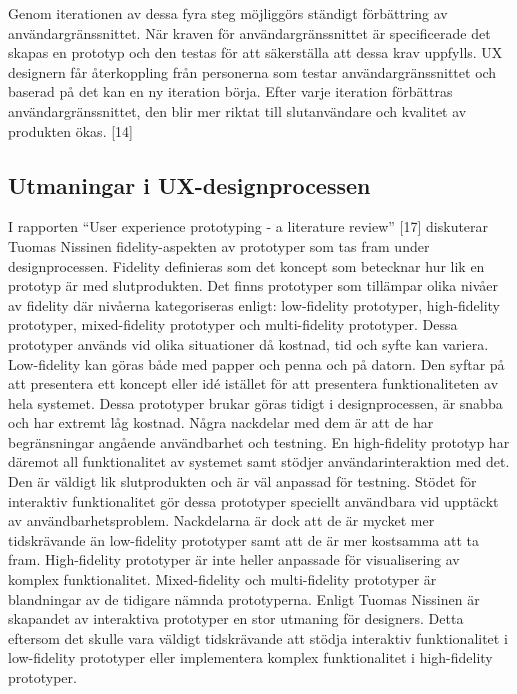 \documentclass[12pt]{kththesis}
\begin{document}
Genom iterationen av dessa fyra steg möjliggörs ständigt förbättring av användargränssnittet. När kraven för användargränssnittet är specificerade det skapas en prototyp och den testas för att säkerställa att dessa krav uppfylls. UX designern får återkoppling från personerna som testar användargränssnittet och baserad på det kan en ny iteration börja. Efter varje iteration förbättras användargränssnittet, den blir mer riktat till slutanvändare och kvalitet av produkten ökas. [14]

\subsection{Utmaningar i UX-designprocessen}

I rapporten “User experience prototyping - a literature review” [17] diskuterar Tuomas Nissinen fidelity-aspekten av prototyper som tas fram under designprocessen. Fidelity definieras som det koncept som betecknar hur lik en prototyp är med slutprodukten. Det finns prototyper som tillämpar olika nivåer av fidelity där nivåerna kategoriseras enligt: low-fidelity prototyper, high-fidelity prototyper, mixed-fidelity prototyper och multi-fidelity prototyper. Dessa prototyper används vid olika situationer då kostnad, tid och syfte kan variera. Low-fidelity kan göras både med papper och penna och på datorn. Den syftar på att presentera ett koncept eller idé istället för att presentera funktionaliteten av hela systemet. Dessa prototyper brukar göras tidigt i designprocessen, är snabba och har extremt låg kostnad. Några nackdelar med dem är att de har begränsningar angående användbarhet och testning. En high-fidelity prototyp har däremot all funktionalitet av systemet samt stödjer användarinteraktion med det. Den är väldigt lik slutprodukten och är väl anpassad för testning. Stödet för interaktiv funktionalitet gör dessa prototyper speciellt användbara vid upptäckt av användbarhetsproblem. Nackdelarna är dock att de är mycket mer tidskrävande än low-fidelity prototyper samt att de är mer kostsamma att ta fram. High-fidelity prototyper är inte heller anpassade för visualisering av komplex funktionalitet. Mixed-fidelity och multi-fidelity prototyper är blandningar av de tidigare nämnda prototyperna. Enligt Tuomas Nissinen är skapandet av interaktiva prototyper en stor utmaning för designers. Detta eftersom det skulle vara väldigt tidskrävande att stödja interaktiv funktionalitet i low-fidelity prototyper eller implementera komplex funktionalitet i high-fidelity prototyper.
\end{document}
